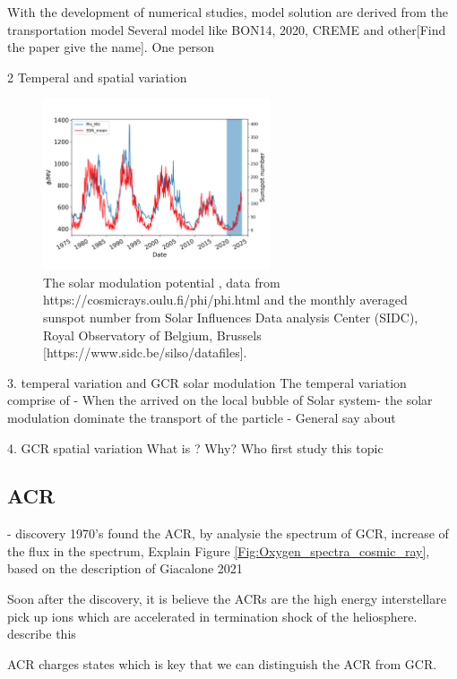     
    With the development of numerical studies, model solution are derived from the transportation model
    Several model like BON14, 2020, CREME and other[Find the paper give the name]. One person  

	
2 Temperal and spatial variation

\begin{figure}
	\centering
	\includegraphics[width = 0.6\textwidth]{images/Solar_modulation.png}
	\caption{The solar modulation potential \cite{Usoskin 2011}, data from https://cosmicrays.oulu.fi/phi/phi.html and the monthly averaged sunspot number from Solar Influences Data analysis Center (SIDC), Royal Observatory of Belgium, Brussels [https://www.sidc.be/silso/datafiles].}
	\label{Fig:Solar_modulation}
\end{figure}



3.  temperal variation and GCR solar modulation 
	 The temperal variation comprise of 
	- When the arrived on the local bubble of Solar system- the solar modulation dominate the transport of the particle - General say about 

4. 	GCR spatial variation
	What is ?
	Why?
	Who first study this topic 



\subsection{ACR}
 - discovery 1970's found the ACR, by analysie the spectrum of GCR, increase of the flux in the spectrum, 
 Explain Figure \ref{Fig:Oxygen_spectra_cosmic_ray}, based on the description of Giacalone 2021

 Soon after the discovery, 
 it is believe the ACRs are the high energy interstellare pick up ions which are accelerated in termination shock of the heliosphere. 
 describe this 

 ACR charges states which is key that we can distinguish the ACR from GCR. 

